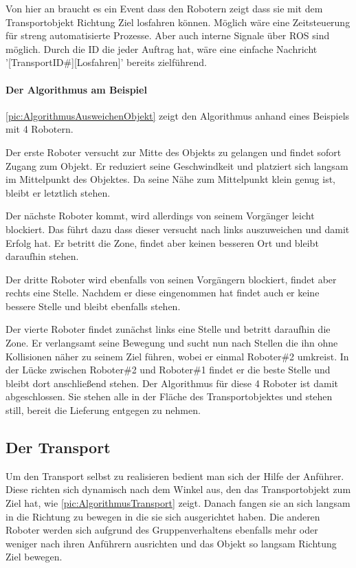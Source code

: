 Von hier an braucht es ein Event dass den Robotern zeigt dass sie mit dem Transportobjekt Richtung Ziel losfahren können. Möglich wäre eine Zeitsteuerung für streng automatisierte Prozesse. Aber auch interne Signale über ROS sind möglich. Durch die ID die jeder Auftrag hat, wäre eine einfache Nachricht '[TransportID\#][Losfahren]' bereits zielführend.

\paragraph*{Der Algorithmus am Beispiel}
\autoref{pic:AlgorithmusAusweichenObjekt} zeigt den Algorithmus anhand eines Beispiels mit 4 Robotern.

Der erste Roboter versucht zur Mitte des Objekts zu gelangen und findet sofort Zugang zum Objekt. Er reduziert seine Geschwindkeit und platziert sich langsam im Mittelpunkt des Objektes. Da seine Nähe zum Mittelpunkt klein genug ist, bleibt er letztlich stehen.

Der nächste Roboter kommt, wird allerdings von seinem Vorgänger leicht blockiert. Das führt dazu dass dieser versucht nach links auszuweichen und damit Erfolg hat. Er betritt die Zone, findet aber keinen besseren Ort und bleibt daraufhin stehen.

Der dritte Roboter wird ebenfalls von seinen Vorgängern blockiert, findet aber rechts eine Stelle. Nachdem er diese eingenommen hat findet auch er keine bessere Stelle und bleibt ebenfalls stehen.

Der vierte Roboter findet zunächst links eine Stelle und betritt daraufhin die Zone. Er verlangsamt seine Bewegung und sucht nun nach Stellen die ihn ohne Kollisionen näher zu seinem Ziel führen, wobei er einmal Roboter\#2 umkreist. In der Lücke zwischen Roboter\#2 und Roboter\#1 findet er die beste Stelle und bleibt dort anschließend stehen. Der Algorithmus für diese 4 Roboter ist damit abgeschlossen. Sie stehen alle in der Fläche des Transportobjektes und stehen still, bereit die Lieferung entgegen zu nehmen.

\subsection*{Der Transport}

Um den Transport selbst zu realisieren bedient man sich der Hilfe der Anführer. Diese richten sich dynamisch nach dem Winkel aus, den das Transportobjekt zum Ziel hat, wie \autoref{pic:AlgorithmusTransport} zeigt. Danach fangen sie an sich langsam in die Richtung zu bewegen in die sie sich ausgerichtet haben. Die anderen Roboter werden sich aufgrund des Gruppenverhaltens ebenfalls mehr oder weniger nach ihren Anführern ausrichten und das Objekt so langsam Richtung Ziel bewegen.

